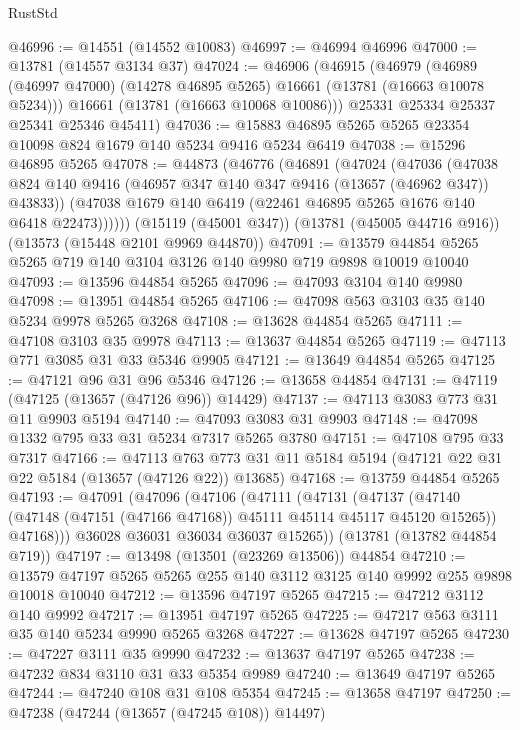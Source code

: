\begin{lexlean}{RustStd}
\begin{coremodule}
@46996 := @14551 (@14552 @10083)
@46997 := @46994 @46996
@47000 := @13781 (@14557 @3134 @37)
@47024 := @46906
    (@46915
      (@46979
        (@46989 (@46997 @47000) (@14278 @46895 @5265) @16661 (@13781 (@16663 @10078 @5234)))
        @16661
        (@13781 (@16663 @10068 @10086)))
      @25331
      @25334
      @25337
      @25341
      @25346
      @45411)
@47036 := @15883 @46895 @5265 @5265 @23354 @10098 @824 @1679 @140 @5234 @9416 @5234 @6419
@47038 := @15296 @46895 @5265
@47078 := @44873
    (@46776
      (@46891
        (@47024
          (@47036
            (@47038 @824 @140 @9416 (@46957 @347 @140 @347 @9416 (@13657 (@46962 @347)) @43833))
            (@47038 @1679 @140 @6419 (@22461 @46895 @5265 @1676 @140 @6418 @22473))))))
    (@15119 (@45001 @347))
    (@13781 (@45005 @44716 @916))
    (@13573 (@15448 @2101 @9969 @44870))
@47091 := @13579 @44854 @5265 @5265 @719 @140 @3104 @3126 @140 @9980 @719 @9898 @10019 @10040
@47093 := @13596 @44854 @5265
@47096 := @47093 @3104 @140 @9980
@47098 := @13951 @44854 @5265
@47106 := @47098 @563 @3103 @35 @140 @5234 @9978 @5265 @3268
@47108 := @13628 @44854 @5265
@47111 := @47108 @3103 @35 @9978
@47113 := @13637 @44854 @5265
@47119 := @47113 @771 @3085 @31 @33 @5346 @9905
@47121 := @13649 @44854 @5265
@47125 := @47121 @96 @31 @96 @5346
@47126 := @13658 @44854
@47131 := @47119 (@47125 (@13657 (@47126 @96)) @14429)
@47137 := @47113 @3083 @773 @31 @11 @9903 @5194
@47140 := @47093 @3083 @31 @9903
@47148 := @47098 @1332 @795 @33 @31 @5234 @7317 @5265 @3780
@47151 := @47108 @795 @33 @7317
@47166 := @47113
    @763
    @773
    @31
    @11
    @5184
    @5194
    (@47121 @22 @31 @22 @5184 (@13657 (@47126 @22)) @13685)
@47168 := @13759 @44854 @5265
@47193 := @47091
    (@47096
      (@47106
        (@47111
          (@47131
            (@47137
              (@47140 (@47148 (@47151 (@47166 @47168)) @45111 @45114 @45117 @45120 @15265))
              @47168)))
        @36028
        @36031
        @36034
        @36037
        @15265))
    (@13781 (@13782 @44854 @719))
@47197 := @13498 (@13501 (@23269 @13506)) @44854
@47210 := @13579 @47197 @5265 @5265 @255 @140 @3112 @3125 @140 @9992 @255 @9898 @10018 @10040
@47212 := @13596 @47197 @5265
@47215 := @47212 @3112 @140 @9992
@47217 := @13951 @47197 @5265
@47225 := @47217 @563 @3111 @35 @140 @5234 @9990 @5265 @3268
@47227 := @13628 @47197 @5265
@47230 := @47227 @3111 @35 @9990
@47232 := @13637 @47197 @5265
@47238 := @47232 @834 @3110 @31 @33 @5354 @9989
@47240 := @13649 @47197 @5265
@47244 := @47240 @108 @31 @108 @5354
@47245 := @13658 @47197
@47250 := @47238 (@47244 (@13657 (@47245 @108)) @14497)

\end{coremodule}
\end{lexlean}
